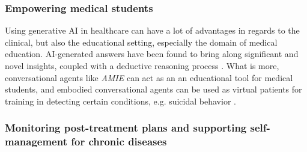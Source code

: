 \subsubsection{Empowering medical students}
Using generative AI in healthcare can have a lot of advantages in regards to the clinical, but also the educational setting, especially the domain of medical education. AI-generated answers have been found to bring along significant and novel insights, coupled with a deductive reasoning process \cite{chaGPTpassesUSMLE2023}. What is more, conversational agents like \textit{AMIE} can act as an an educational tool for medical students, and embodied conversational agents can be used as virtual patients for training in detecting certain conditions, e.g. suicidal behavior \cite{ecaforsuicide2017}.


\subsubsection{Monitoring post-treatment plans and supporting self-management for chronic diseases}\label{Chronic disease}
